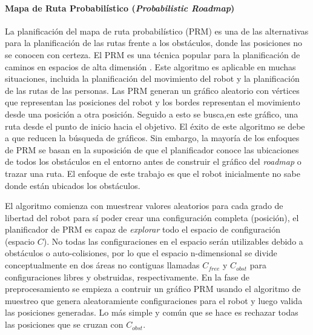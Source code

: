 \paragraph{Mapa de Ruta Probabil\'istico (\textit{Probabilistic Roadmap})}

La planificaci\'on del mapa de ruta probabil\'istico (PRM) es una de las 
alternativas para la planificaci\'on de las rutas frente a los  
obst\'aculos, donde las posiciones no se conocen con certeza. El PRM es una 
t\'ecnica popular para la planificaci\'on de caminos en espacios de alta 
dimensi\'on \cite{guibas1999probabilistic}. Este algoritmo es aplicable 
en muchas situaciones, incluida la planificaci\'on del movimiento del 
robot y la planificaci\'on de las rutas de las personas. Las PRM generan 
un gr\'afico aleatorio con v\'ertices que representan las posiciones del 
robot y los bordes representan el movimiento desde una posici\'on a otra 
posici\'on. Seguido a esto se busca,en este gr\'afico, una ruta desde el 
punto de inicio hacia el objetivo. El \'exito de este algoritmo se debe 
a que reducen la b\'usqueda de gr\'aficos. Sin embargo, la mayor\'ia de 
los enfoques de PRM se basan en la suposici\'on de que el planificador 
conoce las ubicaciones de todos los obst\'aculos en el entorno antes de 
construir el gr\'afico del \textit{roadmap} o trazar una ruta. El enfoque 
de este trabajo es que el robot inicialmente no sabe donde est\'an 
ubicados los obst\'aculos.

El algoritmo comienza con muestrear valores aleatorios para cada grado de 
libertad del robot para s\'i poder crear una configuraci\'on completa 
(posici\'on), el planificador de PRM es capaz de \textit{explorar} todo 
el espacio de configuraci\'on (espacio $C$). No todas las configuraciones 
en el espacio ser\'an utilizables debido a obst\'aculos o auto-colisiones, 
por lo que el espacio n-dimensional se divide conceptualmente en dos \'areas 
no contiguas llamadas $C_{free}$ y $C_{obst}$ para configuraciones libres y 
obstruidas, respectivamente. En la fase de preprocesamiento se empieza a 
contruir un gr\'afico PRM usando el algoritmo de muestreo que genera 
aleatoramiente configuraciones para el robot y luego valida las 
posiciones generadas. Lo m\'as simple y com\'un que se hace es rechazar 
todas las posiciones que se cruzan con $C_{obst}$. 

